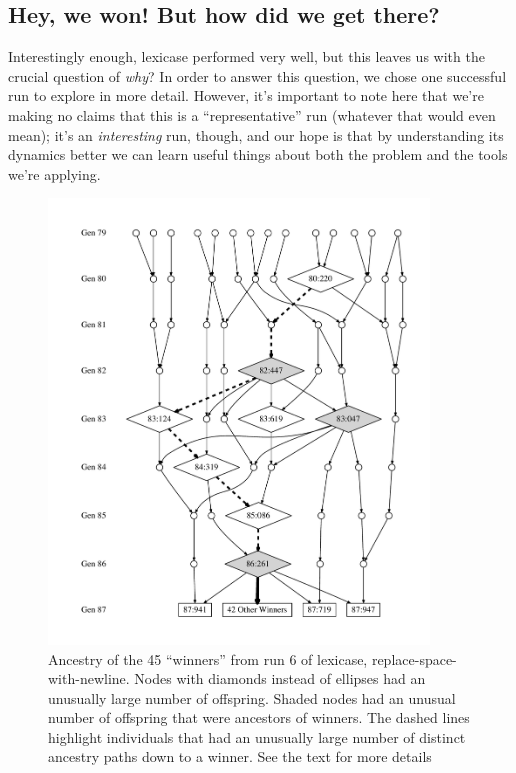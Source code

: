 \subsection{Hey, we won! But how did we get there?}


Interestingly enough, lexicase performed very well, but this leaves us with the crucial question of \emph{why}? 
In order to answer this question, we chose one successful run to explore in more detail. However, it's important to note
here that we're making no claims that this is a ``representative'' run (whatever that would even
mean); it's an \emph{interesting} run, though, and our hope is that by understanding its dynamics
better we can learn useful things about both the problem and the tools we're applying.

\begin{figure}[tp]
	\begin{center}
	\includegraphics[width=0.9\textwidth]{figures/ancestors_of_winners_colons.pdf}
	\end{center}
	\caption{Ancestry of the 45 ``winners'' from run 6 of lexicase, replace-space-with-newline. Nodes
		with diamonds instead of ellipses had an unusually large number of offspring. Shaded nodes
		had an unusual number of offspring that were ancestors of winners. The dashed lines highlight
		individuals that had an unusually large number of distinct ancestry paths down to a winner.
		See the text for more details}
	\label{fig:winnerAncestors}
\end{figure}


